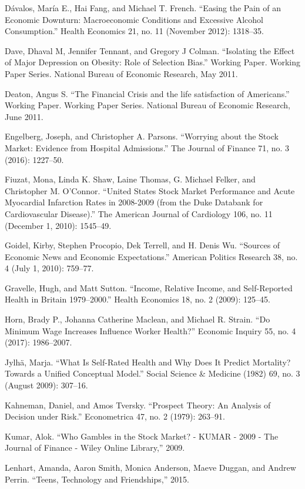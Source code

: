 \documentclass[11pt,a4paper,oldfontcommands]{memoir}
\begin{document}
{\begin{footnotesize}
\begin{thebibliography}{39}
\bibitem{}
Dávalos, María E., Hai Fang, and Michael T. French. “Easing the Pain of an Economic Downturn: Macroeconomic Conditions and Excessive Alcohol Consumption.” Health Economics 21, no. 11 (November 2012): 1318–35. 

\bibitem{}
Dave, Dhaval M, Jennifer Tennant, and Gregory J Colman. “Isolating the Effect of Major Depression on Obesity: Role of Selection Bias.” Working Paper. Working Paper Series. National Bureau of Economic Research, May 2011. 

\bibitem{}
Deaton, Angus S. “The Financial Crisis and the life satisfaction of Americans.” Working Paper. Working Paper Series. National Bureau of Economic Research, June 2011. 

\bibitem{}
Engelberg, Joseph, and Christopher A. Parsons. “Worrying about the Stock Market: Evidence from Hospital Admissions.” The Journal of Finance 71, no. 3 (2016): 1227–50. 

\bibitem{}
Fiuzat, Mona, Linda K. Shaw, Laine Thomas, G. Michael Felker, and Christopher M. O’Connor. “United States Stock Market Performance and Acute Myocardial Infarction Rates in 2008-2009 (from the Duke Databank for Cardiovascular Disease).” The American Journal of Cardiology 106, no. 11 (December 1, 2010): 1545–49.

\bibitem{}
Goidel, Kirby, Stephen Procopio, Dek Terrell, and H. Denis Wu. “Sources of Economic News and Economic Expectations.” American Politics Research 38, no. 4 (July 1, 2010): 759–77. 

\bibitem{}
Gravelle, Hugh, and Matt Sutton. “Income, Relative Income, and Self-Reported Health in Britain 1979–2000.” Health Economics 18, no. 2 (2009): 125–45. 

\bibitem{}
Horn, Brady P., Johanna Catherine Maclean, and Michael R. Strain. “Do Minimum Wage Increases Influence Worker Health?” Economic Inquiry 55, no. 4 (2017): 1986–2007.

\bibitem{}
Jylhä, Marja. “What Is Self-Rated Health and Why Does It Predict Mortality? Towards a Unified Conceptual Model.” Social Science & Medicine (1982) 69, no. 3 (August 2009): 307–16. 

\bibitem{}
Kahneman, Daniel, and Amos Tversky. “Prospect Theory: An Analysis of Decision under Risk.” Econometrica 47, no. 2 (1979): 263–91. 

\bibitem{}
Kumar, Alok. “Who Gambles in the Stock Market? - KUMAR - 2009 - The Journal of Finance - Wiley Online Library,” 2009. 

\bibitem{}
Lenhart, Amanda, Aaron Smith, Monica Anderson, Maeve Duggan, and Andrew Perrin. “Teens, Technology and Friendships,” 2015. 


\end{thebibliography}
\end{footnotesize}}
\end{document}
